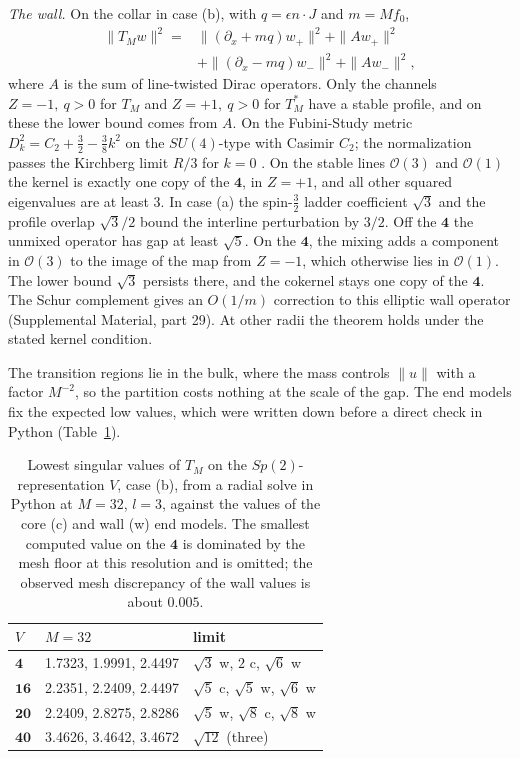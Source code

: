\documentclass[aps,prd,reprint,onecolumn,nofootinbib,amsmath,amssymb,floatfix]{revtex4-2}
\theoremstyle{plain}
\newcommand{\supp}[1]{Supplemental Material, part #1}
\begin{document}
\emph{The wall.} On the collar in case (b), with $q=\epsilon n\cdot J$ and $m=Mf_0$,
\begin{equation}
\begin{aligned}
\|T_Mw\|^2={}&\|(\partial_x+mq)w_+\|^2+\|Aw_+\|^2\\
&+\|(\partial_x-mq)w_-\|^2+\|Aw_-\|^2,
\end{aligned}
\end{equation}
where $A$ is the sum of line-twisted Dirac operators. Only the channels $Z=-1,\ q>0$ for $T_M$ and $Z=+1,\ q>0$ for $T_M^*$ have a stable profile, and on these the lower bound comes from $A$. On the Fubini-Study metric $D_k^2=C_2+\tfrac32-\tfrac38k^2$ on the $SU(4)$-type with Casimir $C_2$; the normalization passes the Kirchberg limit $R/3$ for $k=0$ \cite{Kirchberg1986}. On the stable lines $\mathcal O(3)$ and $\mathcal O(1)$ the kernel is exactly one copy of the $\mathbf 4$, in $Z=+1$, and all other squared eigenvalues are at least $3$. In case (a) the spin-$\frac32$ ladder coefficient $\sqrt3$ and the profile overlap $\sqrt3/2$ bound the interline perturbation by $3/2$. Off the $\mathbf 4$ the unmixed operator has gap at least $\sqrt5$. On the $\mathbf 4$, the mixing adds a component in $\mathcal O(3)$ to the image of the map from $Z=-1$, which otherwise lies in $\mathcal O(1)$. The lower bound $\sqrt3$ persists there, and the cokernel stays one copy of the $\mathbf 4$. The Schur complement gives an $O(1/m)$ correction to this elliptic wall operator (\supp{29}). At other radii the theorem holds under the stated kernel condition.

The transition regions lie in the bulk, where the mass controls $\|u\|$ with a factor $M^{-2}$, so the partition costs nothing at the scale of the gap. The end models fix the expected low values, which were written down before a direct check in Python (Table~\ref{tab:values}).

\begin{table}
\caption{\label{tab:values}Lowest singular values of $T_M$ on the $Sp(2)$-representation $V$, case (b), from a radial solve in Python at $M=32$, $l=3$, against the values of the core (c) and wall (w) end models. The smallest computed value on the $\mathbf 4$ is dominated by the mesh floor at this resolution and is omitted; the observed mesh discrepancy of the wall values is about $0.005$.}
\begin{ruledtabular}
\begin{tabular}{lll}
$V$&$M=32$&limit\\
\hline
$\mathbf 4$&1.7323, 1.9991, 2.4497&$\sqrt3$ w, $2$ c, $\sqrt6$ w\\
$\mathbf{16}$&2.2351, 2.2409, 2.4497&$\sqrt5$ c, $\sqrt5$ w, $\sqrt6$ w\\
$\mathbf{20}$&2.2409, 2.8275, 2.8286&$\sqrt5$ w, $\sqrt8$ c, $\sqrt8$ w\\
$\mathbf{40}$&3.4626, 3.4642, 3.4672&$\sqrt{12}$ (three)
\end{tabular}
\end{ruledtabular}
\end{table}
\end{document}
